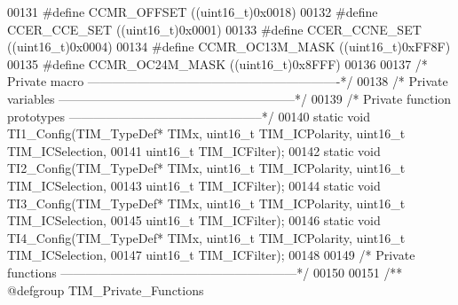 \begin{DoxyCode}
00131 \textcolor{preprocessor}{#}\textcolor{preprocessor}{define} \textcolor{preprocessor}{CCMR\_OFFSET}        \textcolor{preprocessor}{(}\textcolor{preprocessor}{(}\textcolor{preprocessor}{uint16\_t}\textcolor{preprocessor}{)}0x0018\textcolor{preprocessor}{)}
00132 \textcolor{preprocessor}{#}\textcolor{preprocessor}{define} \textcolor{preprocessor}{CCER\_CCE\_SET}       \textcolor{preprocessor}{(}\textcolor{preprocessor}{(}\textcolor{preprocessor}{uint16\_t}\textcolor{preprocessor}{)}0x0001\textcolor{preprocessor}{)}
00133 \textcolor{preprocessor}{#}\textcolor{preprocessor}{define} \textcolor{preprocessor}{CCER\_CCNE\_SET}      \textcolor{preprocessor}{(}\textcolor{preprocessor}{(}\textcolor{preprocessor}{uint16\_t}\textcolor{preprocessor}{)}0x0004\textcolor{preprocessor}{)}
00134 \textcolor{preprocessor}{#}\textcolor{preprocessor}{define} \textcolor{preprocessor}{CCMR\_OC13M\_MASK}    \textcolor{preprocessor}{(}\textcolor{preprocessor}{(}\textcolor{preprocessor}{uint16\_t}\textcolor{preprocessor}{)}0xFF8F\textcolor{preprocessor}{)}
00135 \textcolor{preprocessor}{#}\textcolor{preprocessor}{define} \textcolor{preprocessor}{CCMR\_OC24M\_MASK}    \textcolor{preprocessor}{(}\textcolor{preprocessor}{(}\textcolor{preprocessor}{uint16\_t}\textcolor{preprocessor}{)}0x8FFF\textcolor{preprocessor}{)}
00136 
00137 \textcolor{comment}{/* Private macro -------------------------------------------------------------*/}
00138 \textcolor{comment}{/* Private variables ---------------------------------------------------------*/}
00139 \textcolor{comment}{/* Private function prototypes -----------------------------------------------*/}
00140 \textcolor{keyword}{static} \textcolor{keywordtype}{void} TI1_Config(TIM\_TypeDef* TIMx, uint16\_t TIM\_ICPolarity, uint16\_t TIM\_ICSelection,
00141                        uint16\_t TIM\_ICFilter);
00142 \textcolor{keyword}{static} \textcolor{keywordtype}{void} TI2_Config(TIM\_TypeDef* TIMx, uint16\_t TIM\_ICPolarity, uint16\_t TIM\_ICSelection,
00143                        uint16\_t TIM\_ICFilter);
00144 \textcolor{keyword}{static} \textcolor{keywordtype}{void} TI3_Config(TIM\_TypeDef* TIMx, uint16\_t TIM\_ICPolarity, uint16\_t TIM\_ICSelection,
00145                        uint16\_t TIM\_ICFilter);
00146 \textcolor{keyword}{static} \textcolor{keywordtype}{void} TI4_Config(TIM\_TypeDef* TIMx, uint16\_t TIM\_ICPolarity, uint16\_t TIM\_ICSelection,
00147                        uint16\_t TIM\_ICFilter);
00148 
00149 \textcolor{comment}{/* Private functions ---------------------------------------------------------*/}
00150 
00151 \textcolor{comment}{/** @defgroup TIM\_Private\_Functions}

\end{DoxyCode}
